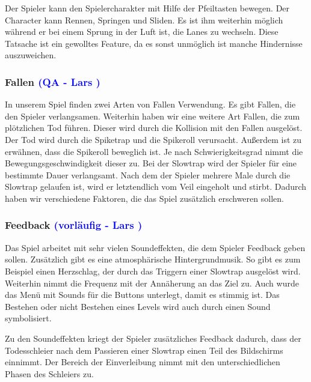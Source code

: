 \documentclass[12pt]{article}
\begin{document}
Der Spieler kann den Spielercharakter mit Hilfe der Pfeiltasten bewegen. Der Character kann Rennen, Springen und Sliden. Es ist ihm weiterhin möglich
während er bei einem Sprung in der Luft ist, die Lanes zu wechseln. Diese Tatsache ist ein gewolltes Feature, da es sonst unmöglich ist manche Hindernisse
auszuweichen.

\vspace{1cm}
\subsubsection{Fallen \textcolor{blue}{(QA - Lars )}}

In unserem Spiel finden zwei Arten von Fallen Verwendung. Es gibt Fallen, die den Spieler verlangsamen. Weiterhin haben wir eine
weitere Art Fallen, die zum plötzlichen Tod führen. Dieser wird durch die Kollision mit den Fallen ausgelöst. Der Tod wird durch die
Spiketrap und die Spikeroll verursacht. Außerdem ist zu erwähnen, dass die Spikeroll beweglich ist. Je nach Schwierigkeitsgrad nimmt
die Bewegungsgeschwindigkeit dieser zu. Bei der Slowtrap wird der Spieler für eine bestimmte Dauer verlangsamt. Nach dem der Spieler
mehrere Male durch die Slowtrap gelaufen ist, wird er letztendlich vom Veil eingeholt und stirbt. Dadurch haben wir verschiedene Faktoren,
die das Spiel zusätzlich erschweren sollen.

\vspace{1cm}
\subsubsection{Feedback \textcolor{blue}{(vorläufig - Lars )}}

Das Spiel arbeitet mit sehr vielen Soundeffekten, die dem Spieler Feedback geben sollen.
Zusätzlich gibt es eine atmosphärische Hintergrundmusik. So gibt es zum Beispiel einen Herzschlag, der durch das Triggern einer Slowtrap ausgelöst
wird. Weiterhin nimmt die Frequenz mit der Annäherung an das Ziel zu. Auch wurde das Menü mit Sounds für die Buttons unterlegt, damit es stimmig
ist. Das Bestehen oder nicht Bestehen eines Levels wird auch durch einen Sound symbolisiert. \newline

\noindent Zu den Soundeffekten kriegt der Spieler zusätzliches Feedback dadurch, dass der Todesschleier nach dem Passieren einer Slowtrap einen Teil des
Bildschirms einnimmt. Der Bereich der Einverleibung nimmt mit den unterschiedlichen Phasen des Schleiers zu. 
\end{document}
